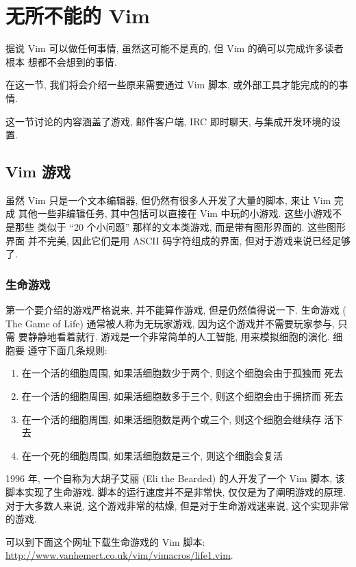 \chapter{无所不能的 Vim}
\label{chap:vim_can_do_everything}

据说 Vim 可以做任何事情, 虽然这可能不是真的, 但 Vim 的确可以完成许多读者根本
想都不会想到的事情.

在这一节, 我们将会介绍一些原来需要通过 Vim 脚本, 或外部工具才能完成的的事情.

这一节讨论的内容涵盖了游戏, 邮件客户端, IRC 即时聊天, 与集成开发环境的设置.

\section{Vim 游戏}
\label{sec:vim_games}

虽然 Vim 只是一个文本编辑器, 但仍然有很多人开发了大量的脚本, 来让 Vim 完成
其他一些非编辑任务, 其中包括可以直接在 Vim 中玩的小游戏. 这些小游戏不是那些
类似于 ``20 个小问题'' 那样的文本类游戏, 而是带有图形界面的. 这些图形界面
并不完美, 因此它们是用 ASCII 码字符组成的界面, 但对于游戏来说已经足够了.

\subsection{生命游戏}
\label{subsec:game_of_life}

第一个要介绍的游戏严格说来, 并不能算作游戏, 但是仍然值得说一下. 生命游戏 (
The Game of Life) 通常被人称为无玩家游戏, 因为这个游戏并不需要玩家参与, 只需
要静静地看着就行. 游戏是一个非常简单的人工智能, 用来模拟细胞的演化. 细胞要
遵守下面几条规则:
\begin{enumerate}
	\item 在一个活的细胞周围, 如果活细胞数少于两个, 则这个细胞会由于孤独而
		死去
	\item 在一个活的细胞周围, 如果活细胞数多于三个, 则这个细胞会由于拥挤而
		死去
	\item 在一个活的细胞周围, 如果活细胞数是两个或三个, 则这个细胞会继续存
		活下去
	\item 在一个死的细胞周围, 如果活细胞数是三个, 则这个细胞会复活
\end{enumerate}

1996 年, 一个自称为大胡子艾丽 (Eli the Bearded) 的人开发了一个 Vim 脚本, 该
脚本实现了生命游戏. 脚本的运行速度并不是非常快, 仅仅是为了阐明游戏的原理.
对于大多数人来说, 这个游戏非常的枯燥, 但是对于生命游戏迷来说, 这个实现非常
的游戏.

可以到下面这个网址下载生命游戏的 Vim 脚本:
\url{http://www.vanhemert.co.uk/vim/vimacros/life1.vim}.
